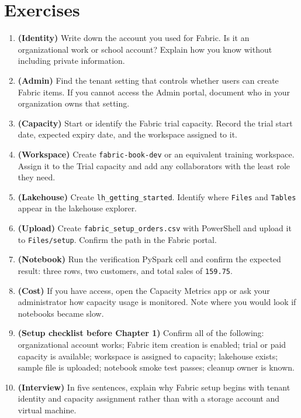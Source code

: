 \section{Exercises}
\begin{enumerate}
    \item \textbf{(Identity)} Write down the account you used for Fabric. Is it an organizational work or school account? Explain how you know without including private information.
    \item \textbf{(Admin)} Find the tenant setting that controls whether users can create Fabric items. If you cannot access the Admin portal, document who in your organization owns that setting.
    \item \textbf{(Capacity)} Start or identify the Fabric trial capacity. Record the trial start date, expected expiry date, and the workspace assigned to it.
    \item \textbf{(Workspace)} Create \texttt{fabric-book-dev} or an equivalent training workspace. Assign it to the Trial capacity and add any collaborators with the least role they need.
    \item \textbf{(Lakehouse)} Create \texttt{lh\_getting\_started}. Identify where \texttt{Files} and \texttt{Tables} appear in the lakehouse explorer.
    \item \textbf{(Upload)} Create \texttt{fabric\_setup\_orders.csv} with PowerShell and upload it to \texttt{Files/setup}. Confirm the path in the Fabric portal.
    \item \textbf{(Notebook)} Run the verification PySpark cell and confirm the expected result: three rows, two customers, and total sales of \texttt{159.75}.
    \item \textbf{(Cost)} If you have access, open the Capacity Metrics app or ask your administrator how capacity usage is monitored. Note where you would look if notebooks became slow.
    \item \textbf{(Setup checklist before Chapter 1)} Confirm all of the following: organizational account works; Fabric item creation is enabled; trial or paid capacity is available; workspace is assigned to capacity; lakehouse exists; sample file is uploaded; notebook smoke test passes; cleanup owner is known.
    \item \textbf{(Interview)} In five sentences, explain why Fabric setup begins with tenant identity and capacity assignment rather than with a storage account and virtual machine.
\end{enumerate}

